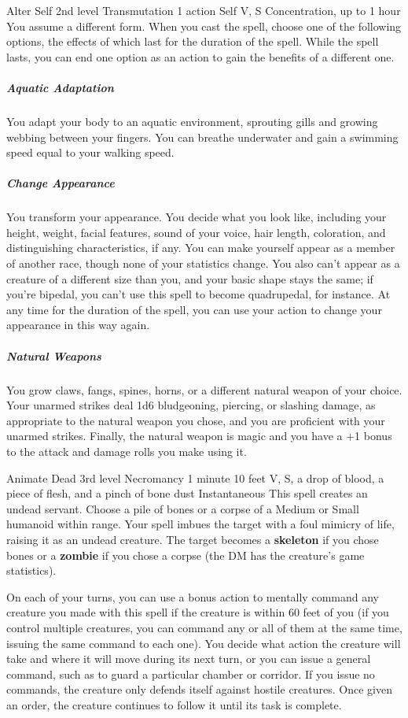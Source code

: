 \documentclass[10pt,a4paper,twoside,bg=print,twocolumn,openany,nodeprecatedcode]{dndbook}
\begin{document}
\DndSpellHeader%
{Alter Self}
{2nd level Transmutation}
{1 action}
{Self}
{V, S}
{Concentration, up to 1 hour}
You assume a different form. When you cast the spell, choose one of the following options, the effects of which last for the duration of the spell. While the spell lasts, you can end one option as an action to gain the benefits of a different one.

\subparagraph{Aquatic Adaptation}
You adapt your body to an aquatic environment, sprouting gills and growing webbing between your fingers. You can breathe underwater and gain a swimming speed equal to your walking speed.

\subparagraph{Change Appearance}
You transform your appearance. You decide what you look like, including your height, weight, facial features, sound of your voice, hair length, coloration, and distinguishing characteristics, if any. You can make yourself appear as a member of another race, though none of your statistics change. You also can't appear as a creature of a different size than you, and your basic shape stays the same; if you're bipedal, you can't use this spell to become quadrupedal, for instance. At any time for the duration of the spell, you can use your action to change your appearance in this way again.

\subparagraph{Natural Weapons}
You grow claws, fangs, spines, horns, or a different natural weapon of your choice. Your unarmed strikes deal 1d6 bludgeoning, piercing, or slashing damage, as appropriate to the natural weapon you chose, and you are proficient with your unarmed strikes. Finally, the natural weapon is magic and you have a +1 bonus to the attack and damage rolls you make using it.



\DndSpellHeader%
{Animate Dead}
{3rd level Necromancy}
{1 minute}
{10 feet}
{V, S, a drop of blood, a piece of flesh, and a pinch of bone dust}
{Instantaneous}
This spell creates an undead servant. Choose a pile of bones or a corpse of a Medium or Small humanoid within range. Your spell imbues the target with a foul mimicry of life, raising it as an undead creature. The target becomes a \textbf{skeleton} if you chose bones or a \textbf{zombie} if you chose a corpse (the DM has the creature's game statistics).

On each of your turns, you can use a bonus action to mentally command any creature you made with this spell if the creature is within 60 feet of you (if you control multiple creatures, you can command any or all of them at the same time, issuing the same command to each one). You decide what action the creature will take and where it will move during its next turn, or you can issue a general command, such as to guard a particular chamber or corridor. If you issue no commands, the creature only defends itself against hostile creatures. Once given an order, the creature continues to follow it until its task is complete.
\end{document}
